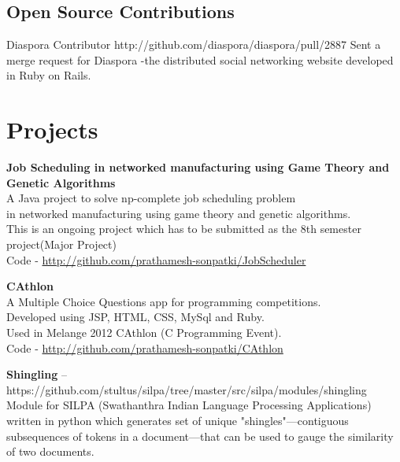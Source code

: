 \documentclass[11pt,a4paper]{moderncv}
\begin{document}
\subsection{Open Source Contributions}

\cventry
         {}
         {Diaspora}
         {Contributor}
         {}
         {http://github.com/diaspora/diaspora/pull/2887}
         {
          Sent a merge request for Diaspora -the distributed social
          networking website developed in Ruby on Rails. }



\section{Projects}

\cvlistitem
{\textbf
        {
         Job Scheduling in networked manufacturing using Game Theory
         and Genetic Algorithms
        }   
      \\A Java project to solve np-complete job scheduling problem \\
      in networked manufacturing using game theory and genetic algorithms.\\
      This is an ongoing project which has to be submitted as the 8th
      semester project(Major Project) \\
      Code - \url{http://github.com/prathamesh-sonpatki/JobScheduler}
}

\cvlistitem
{\textbf
      {CAthlon}  
      \\A Multiple Choice Questions app for programming competitions.\\
      Developed using JSP, HTML, CSS, MySql and Ruby.\\
      Used in Melange 2012 CAthlon (C Programming Event). \\
      Code - \url{http://github.com/prathamesh-sonpatki/CAthlon}
}

\cvlistitem
{\textbf{Shingling} -- {\small https://github.com/stultus/silpa/tree/master/src/silpa/modules/shingling}
  \\Module for SILPA (Swathanthra Indian Language Processing Applications)\\
    written in python which generates set of unique "shingles"—contiguous  \\
    subsequences of tokens in a document—that can be used to gauge the similarity of two documents.\\
}
\end{document}
